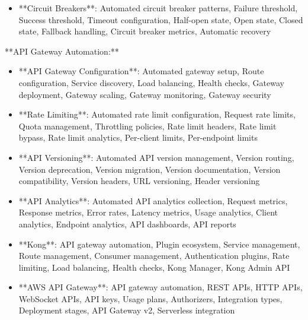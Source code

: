 \documentclass[11pt,a4paper]{article}
\begin{document}
\begin{itemize}
\item **Circuit Breakers**: Automated circuit breaker patterns, Failure threshold, Success threshold, Timeout configuration, Half-open state, Open state, Closed state, Fallback handling, Circuit breaker metrics, Automatic recovery
\end{itemize}

**API Gateway Automation:**

\begin{itemize}
\item **API Gateway Configuration**: Automated gateway setup, Route configuration, Service discovery, Load balancing, Health checks, Gateway deployment, Gateway scaling, Gateway monitoring, Gateway security
\end{itemize}

\begin{itemize}
\item **Rate Limiting**: Automated rate limit configuration, Request rate limits, Quota management, Throttling policies, Rate limit headers, Rate limit bypass, Rate limit analytics, Per-client limits, Per-endpoint limits
\end{itemize}

\begin{itemize}
\item **API Versioning**: Automated API version management, Version routing, Version deprecation, Version migration, Version documentation, Version compatibility, Version headers, URL versioning, Header versioning
\end{itemize}

\begin{itemize}
\item **API Analytics**: Automated API analytics collection, Request metrics, Response metrics, Error rates, Latency metrics, Usage analytics, Client analytics, Endpoint analytics, API dashboards, API reports
\end{itemize}

\begin{itemize}
\item **Kong**: API gateway automation, Plugin ecosystem, Service management, Route management, Consumer management, Authentication plugins, Rate limiting, Load balancing, Health checks, Kong Manager, Kong Admin API
\end{itemize}

\begin{itemize}
\item **AWS API Gateway**: API gateway automation, REST APIs, HTTP APIs, WebSocket APIs, API keys, Usage plans, Authorizers, Integration types, Deployment stages, API Gateway v2, Serverless integration
\end{itemize}
\end{document}
